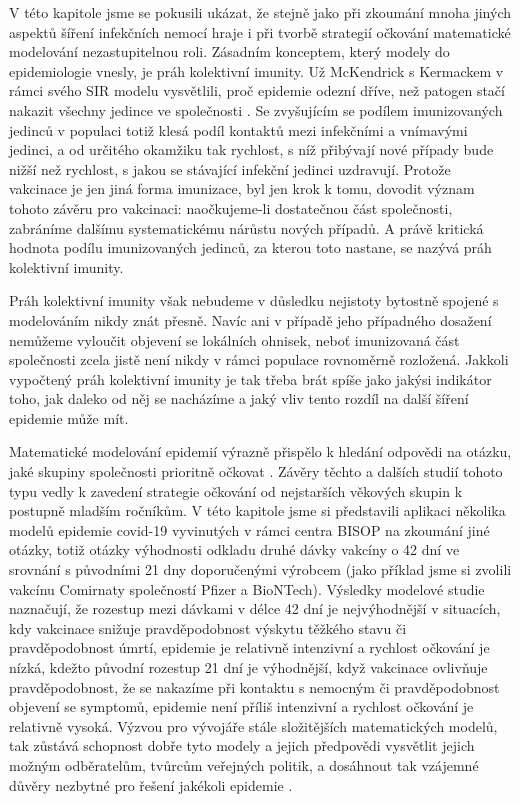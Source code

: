 V této kapitole jsme se pokusili ukázat, že stejně jako při zkoumání mnoha jiných aspektů šíření infekčních nemocí hraje i při tvorbě strategií očkování matematické modelování nezastupitelnou roli. Zásadním konceptem, který modely do epidemiologie vnesly, je práh kolektivní imunity. Už McKendrick s Kermackem v rámci svého SIR modelu vysvětlili, proč epidemie odezní dříve, než patogen stačí nakazit všechny jedince ve společnosti \cite[viz také kapitola \ref{Typy_modelu}]{Bacaer2011}. Se zvyšujícím se podílem imunizovaných jedinců v populaci totiž klesá podíl kontaktů mezi infekčními a vnímavými jedinci, a od určitého okamžiku tak rychlost, s níž přibývají nové případy bude nižší než rychlost, s jakou se stávající infekční jedinci uzdravují. Protože vakcinace je jen jiná forma imunizace, byl jen krok k tomu, dovodit význam tohoto závěru pro vakcinaci: naočkujeme-li dostatečnou část společnosti, zabráníme dalšímu systematickému nárůstu nových případů. A právě kritická hodnota podílu imunizovaných jedinců, za kterou toto nastane, se nazývá práh kolektivní imunity.

Práh kolektivní imunity však nebudeme v důsledku nejistoty bytostně spojené s modelováním nikdy znát přesně. Navíc ani v případě jeho případného dosažení nemůžeme vyloučit objevení se lokálních ohnisek, neboť imunizovaná část společnosti zcela jistě není nikdy v rámci populace rovnoměrně rozložená. Jakkoli vypočtený práh kolektivní imunity je tak třeba brát spíše jako jakýsi indikátor toho, jak daleko od něj se nacházíme a jaký vliv tento rozdíl na další šíření epidemie může mít. 

Matematické modelování epidemií výrazně přispělo k hledání odpovědi na otázku, jaké skupiny společnosti prioritně očkovat \cite{Bubar_etal2021,Moore_etal2021b}. Závěry těchto a dalších studií tohoto typu vedly k zavedení strategie očkování od nejstarších věkových skupin k postupně mladším ročníkům. V této kapitole jsme si představili aplikaci několika modelů epidemie covid-19 vyvinutých v rámci centra BISOP na zkoumání jiné otázky, totiž otázky výhodnosti odkladu druhé dávky vakcíny o 42 dní ve srovnání s původními 21 dny doporučenými výrobcem (jako příklad jsme si zvolili vakcínu Comirnaty společností Pfizer a BioNTech). Výsledky modelové studie naznačují, že rozestup mezi dávkami v délce 42 dní je nejvýhodnější v situacích, kdy vakcinace snižuje pravděpodobnost výskytu těžkého stavu či pravděpodobnost úmrtí, epidemie je relativně intenzivní a rychlost očkování je nízká, kdežto původní rozestup 21 dní je výhodnější, když vakcinace ovlivňuje pravděpodobnost, že se nakazíme při kontaktu s nemocným či pravděpodobnost objevení se symptomů, epidemie není příliš intenzivní a rychlost očkování je relativně vysoká. Výzvou pro vývojáře stále složitějších matematických modelů, tak zůstává schopnost dobře tyto modely a jejich předpovědi vysvětlit jejich možným odběratelům, tvůrcům veřejných politik, a dosáhnout tak vzájemné důvěry nezbytné pro řešení jakékoli epidemie \cite{BasuAndrews2013}.